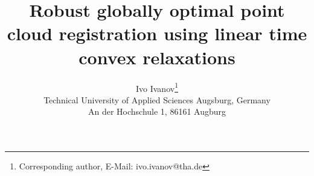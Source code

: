 \documentclass[10pt,twocolumn,letterpaper]{article}
\title{Robust globally optimal point cloud registration using linear time convex relaxations}
\author{Ivo Ivanov\thanks{Corresponding author, E-Mail: ivo.ivanov@tha.de}\\
Technical University of Applied Sciences Augsburg, Germany\\
An der Hochschule 1, 86161 Augburg\\
}
\begin{document}
\maketitle
    





{
    \small
    
    
}


\end{document}
